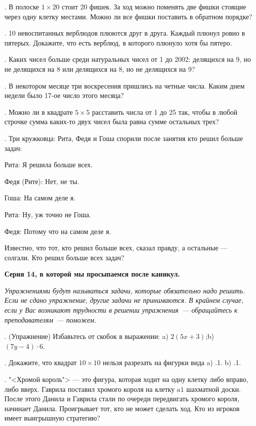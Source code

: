 . В полоске $1 \times 20$ стоит 20 фишек. За ход можно поменять две
фишки стоящие через одну клетку местами. Можно ли все фишки поставить в
обратном порядке?

. 10 невоспитанных верблюдов плюются друг в друга. Каждый плюнул ровно
в пятерых. Докажите, что есть верблюд, в которого плюнуло хотя бы пятеро.

. Каких чисел больше среди натуральных чисел от 1 до 2002: делящихся
на 9, но не делящихся на 8 или делящихся на 8, но не делящихся на 9?

. В некотором месяце три воскресения пришлись на четные числа. Каким
днем недели было 17-ое число этого месяца?

. Можно ли в квадрате $5 \times 5$ расставить числа от 1 до 25 так,
чтобы в любой строчке сумма каких-то двух чисел была равна сумме
остальных трех?

. Три кружковца: Рита, Федя и Гоша спорили после занятия кто решил
больше задач: \par
Рита: Я решила больше всех. \par
Федя (Рите): Нет, не ты. \par
Гоша: На самом деле я. \par
Рита: Ну, уж точно не Гоша. \par
Федя: Потому что на самом деле я. \par
Известно, что тот, кто решил больше всех, сказал правду,
а остальные --- солгали. Кто решил больше всех задач?
\centerline{\bf Серия 14, в которой мы просыпаемся после каникул.}

{\it \noindent Упражнениями будут называться задачи, которые 
обязательно надо решить.  
Если не сдано упражнение, другие задачи не принимаются. 
В крайнем случае, 
если у Вас возникают трудности в решении упражнения~--- обращайтесь к преподавателям~--- поможем.}
\smallskip

. (Упражнение) Избавьтесь от скобок в выражении:
a) $2(5x+3)$;\quad  b) $(7y-4)\cdot 6$.

. Докажите, что квадрат  $10\times 10$ нельзя разрезать на
фигурки вида a) \lower.1\cellsize\cells{
   _
 _|_|_ 
|_|_|_|
}. b) \lower.1\cellsize\cells{
     _
 _ _|_| 
|_|_|_|
}. 

.   "<Хромой король"> ---  это фигура, которая ходит на одну клетку либо  
вправо, либо  вверх.
Гаврила поставил хромого короля на клетку $a1$ шахматной доски. 
После этого Данила и Гаврила стали по очереди передвигать хромого короля, начинает Данила.  
Проигрывает тот, кто не может сделать ход. Кто из игроков 
имеет выигрышную стратегию?

